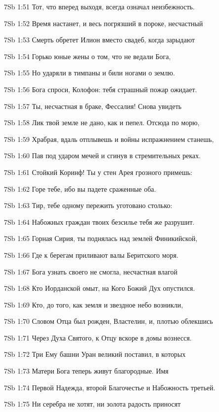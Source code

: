 \vs 7Sb 1:51 Тот, что вперед выходя, всегда означал неизбежность.

\vs 7Sb 1:52 Время настанет, и весь погрязший в пороке, несчастный 

\vs 7Sb 1:53 Смерть обретет Илион вместо свадеб, когда зарыдают 

\vs 7Sb 1:54 Горько юные жены о том, что не ведали Бога, 

\vs 7Sb 1:55 Но ударяли в тимпаны и били ногами о землю.

\vs 7Sb 1:56 Бога спроси, Колофон: тебя страшный пожар ожидает.

\vs 7Sb 1:57 Ты, несчастная в браке, Фессалия! Снова увидеть 

\vs 7Sb 1:58 Лик твой земле не дано, как и пепел. Отсюда по морю, 

\vs 7Sb 1:59 Храбрая, вдаль отплывешь и войны испражнением станешь, 

\vs 7Sb 1:60 Пав под ударом мечей и сгинув в стремительных реках. 

\vs 7Sb 1:61 Стойкий Коринф! Ты у стен Арея грозного примешь: 

\vs 7Sb 1:62 Горе тебе, ибо вы падете сраженные оба.

\vs 7Sb 1:63 Тир, тебе одному пережить уготовано столько: 

\vs 7Sb 1:64 Набожных граждан твоих безсилье тебя же разрушит.

\vs 7Sb 1:65 Горная Сирия, ты поднялась над землей Финикийской, 

\vs 7Sb 1:66 Где к берегам приливают валы Беритского моря. 

\vs 7Sb 1:67 Бога узнать своего не смогла, несчастная  влагой 

\vs 7Sb 1:68 Кто Иорданской омыт, на Кого Божий Дух опустился. 

\vs 7Sb 1:69 Кто, до того, как земля и звездное небо возникли, 

\vs 7Sb 1:70 Словом Отца был рожден, Властелин, и, плотью облекшись 

\vs 7Sb 1:71 Через Духа Святого, к Отцу вскоре в домы вознесся. 

\vs 7Sb 1:72 Три Ему башни Уран великий поставил, в которых 

\vs 7Sb 1:73 Матери Бога теперь живут благородные. Имя 

\vs 7Sb 1:74 Первой  Надежда, второй  Благочестье и Набожность  третьей.

\vs 7Sb 1:75 Ни серебра не хотят, ни золота  радость приносят 

